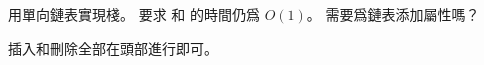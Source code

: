 \startEXERCISE
用單向鏈表實現棧。
要求  和  的時間仍爲 $O(1)$。
需要爲鏈表添加屬性嗎？
\stopEXERCISE

\startANSWER
插入和刪除全部在頭部進行即可。
\stopANSWER
